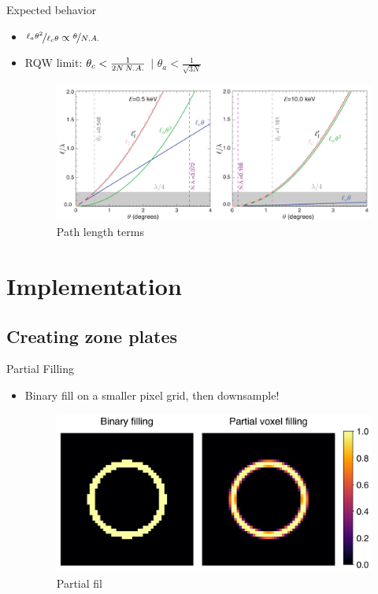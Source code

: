 \documentclass{beamer}
\def\thetaellc{\theta_c} %
\def\thetaella{\theta_a} %
\def\ellapproxc{\ell_{c}}
\def\ellapproxa{\ell_{a}}
\def\thetaellc{\theta_c} %
\def\thetaella{\theta_a} %
\def\ellapproxc{\ell_{c}}
\def\ellapproxa{\ell_{a}}
\begin{document}
\begin{frame}{Expected behavior}
	\begin{itemize}
		\item $\nicefrac{\ellapproxa \theta^{2}}{\ellapproxc\theta} \propto\nicefrac{\theta}{\scriptsize{N.A.}}$
		\item RQW limit\footnotemark : $\thetaellc < \frac{1}{2N\,\scriptsize{N.A.}}$ $|$ $\thetaella < \frac{1}{\sqrt{3N}}$
		\begin{center}
			\begin{figure}
				\includegraphics[scale=0.35]{path_length_terms}
				\caption{Path length terms}	
			\end{figure}
		\end{center}
	\end{itemize}
\end{frame}


\section{Implementation}
\subsection{Creating zone plates}
\begin{frame}{Partial Filling}
	\begin{itemize}
		\item Binary fill on a smaller pixel grid, then downsample!
		\begin{center}
			\begin{figure}
				\includegraphics[scale=0.35]{partial_fill}
				\caption{Partial fil}	
			\end{figure}
		\end{center}
	\end{itemize}
\end{frame}
\end{document}
